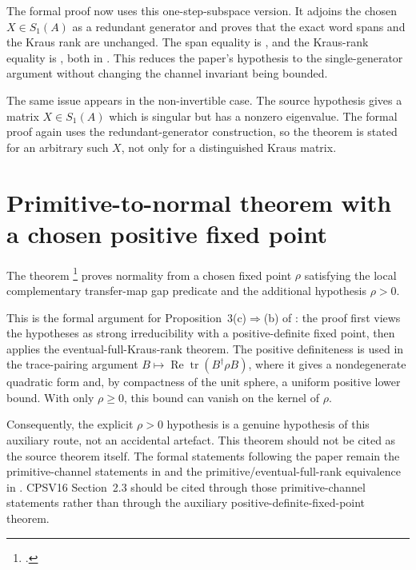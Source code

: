 \documentclass{article}
\begin{document}
The formal proof now uses this one-step-subspace version. It adjoins the
chosen $X\in S_1(A)$ as a redundant generator and proves that the exact word
spans and the Kraus rank are unchanged. The span equality is
, and the Kraus-rank equality is
, both in
. This reduces the
paper's hypothesis to the single-generator argument without changing the
channel invariant being bounded.

The same issue appears in the non-invertible case. The source hypothesis gives
a matrix $X\in S_1(A)$ which is singular but has a nonzero eigenvalue. The
formal proof again uses the redundant-generator construction, so the theorem is
stated for an arbitrary such $X$, not only for a distinguished Kraus matrix.

\section{Primitive-to-normal theorem with a chosen positive fixed point}

The theorem
\footnote{%
    .}
proves normality from a chosen fixed point $\rho$ satisfying the local
complementary transfer-map gap predicate  and the additional hypothesis
$\rho>0$.

This is the formal argument for Proposition~3(c)$\Rightarrow$(b) of
\cite{Sanz2010Quantum}: the proof first views the hypotheses as strong
irreducibility with a positive-definite fixed point, then applies the
eventual-full-Kraus-rank theorem. The positive definiteness is used in the
trace-pairing argument $B\mapsto \operatorname{Re}\operatorname{tr}(B^\dagger
\rho B)$, where it gives a nondegenerate quadratic form and, by compactness of
the unit sphere, a uniform positive lower bound. With only
$\rho\geq 0$, this bound can vanish on the kernel of $\rho$.

Consequently, the explicit $\rho>0$ hypothesis is a genuine hypothesis of this
auxiliary route, not an accidental artefact. This theorem should not be cited as
the source theorem itself. The formal statements following the paper remain the
primitive-channel statements in
 and the
primitive/even\-tual-full-rank equivalence in
. CPSV16 Section~2.3 should
be cited through those primitive-channel statements rather than through the
auxiliary positive-definite-fixed-point theorem.
\end{document}
